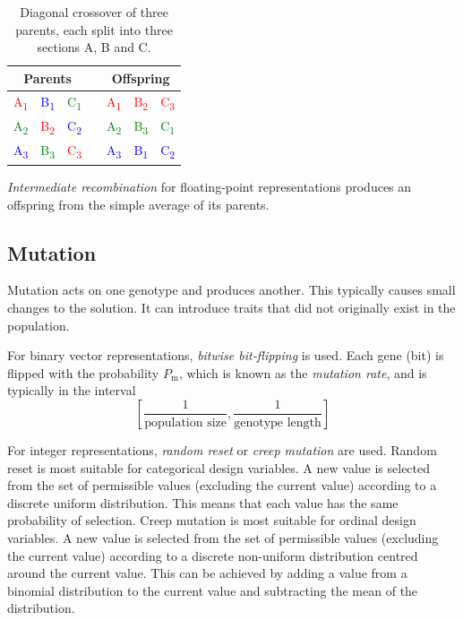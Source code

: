 \begin{table}[!htp]
  \centering
  \caption*{Diagonal crossover of three parents, each split into three sections A, B and C.}
  \begin{tabular}{ccccccc}
    \toprule
    \multicolumn{3}{c}{Parents} & & \multicolumn{3}{c}{Offspring} \\
    \midrule
    \textcolor{red}{A\textsubscript{1}} & \textcolor{blue}{B\textsubscript{1}} & \textcolor{green}{C\textsubscript{1}} & &
    \textcolor{red}{A\textsubscript{1}} & \textcolor{red}{B\textsubscript{2}} & \textcolor{red}{C\textsubscript{3}} \\
    \textcolor{green}{A\textsubscript{2}} & \textcolor{red}{B\textsubscript{2}} & \textcolor{blue}{C\textsubscript{2}} & &
    \textcolor{green}{A\textsubscript{2}} & \textcolor{green}{B\textsubscript{3}} & \textcolor{green}{C\textsubscript{1}} \\
    \textcolor{blue}{A\textsubscript{3}} & \textcolor{green}{B\textsubscript{3}} & \textcolor{red}{C\textsubscript{3}} & &
    \textcolor{blue}{A\textsubscript{3}} & \textcolor{blue}{B\textsubscript{1}} & \textcolor{blue}{C\textsubscript{2}} \\
    \bottomrule
  \end{tabular}
\end{table}

\emph{Intermediate recombination} for floating-point representations produces an offspring from the simple average of its parents.

\subsection{Mutation}

Mutation acts on one genotype and produces another.
This typically causes small changes to the solution.
It can introduce traits that did not originally exist in the population.

For binary vector representations, \emph{bitwise bit-flipping} is used.
Each gene (bit) is flipped with the probability \( P_{\mathrm{m}} \), which is known as the \emph{mutation rate}, and is typically in the interval
\begin{equation*}
  \left[ \frac{1}{\text{population size}}, \frac{1}{\text{genotype length}} \right]
\end{equation*}

For integer representations, \emph{random reset} or \emph{creep mutation} are used.
Random reset is most suitable for categorical design variables.
A new value is selected from the set of permissible values (excluding the current value) according to a discrete uniform distribution.
This means that each value has the same probability of selection.
Creep mutation is most suitable for ordinal design variables.
A new value is selected from the set of permissible values (excluding the current value) according to a discrete non-uniform distribution centred around the current value.
This can be achieved by adding a value from a binomial distribution to the current value and subtracting the mean of the distribution.

